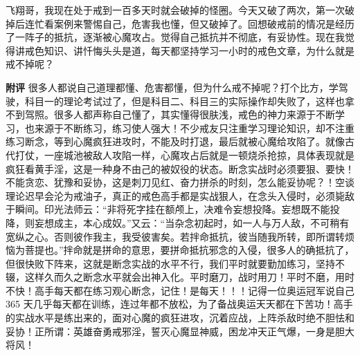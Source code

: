 \begin{case}
    飞翔哥，我现在处于戒到一百多天时就会破掉的怪圈。今天又破了两次，第一次破掉后连忙看案例来警惕自己，危害我也懂，但又破掉了。回想破戒前的情况是经历了一阵子的抵抗，逐渐被心魔攻占。觉得自己抵抗并不彻底，有妥协性。现在我觉得讲戒色知识、讲忏悔头头是道，每天都坚持学习一小时的戒色文章，为什么就是戒不掉呢？

    \textbf{附评} 很多人都说自己道理都懂、危害都懂，但为什么戒不掉呢？打个比方，学驾驶，科目一的理论考试过了，但是科目二、科目三的实际操作却失败了，这样也拿不到驾照。很多人都声称自己懂了，其实懂得很肤浅，戒色的神力来源于不断学习，也来源于不断练习，练习使人强大！不少戒友只注重学习理论知识，却不注重练习断念，等到心魔疯狂进攻时，不能及时打退，最后就被心魔给攻陷了。就像古代打仗，一座城池被敌人攻陷一样，心魔攻占后就是一顿烧杀抢掠，具体表现就是疯狂看黄手淫，这是一种身不由己的被奴役的状态。断念实战时必须要狠、要快！不能贪恋、犹豫和妥协，这是刺刀见红、奋力拼杀的时刻，怎么能妥协呢？！空谈理论迟早会沦为戒油子，真正的戒色高手都是实战狠人，在念头入侵时，必须毙敌于瞬间。印光法师云：“非将死字挂在额颅上，决难令妄想投降。妄想既不能投降，则妄想成主，本心成奴。”又云：“当杂念初起时，如一人与万人敌，不可稍有宽纵之心。否则彼作我主，我受彼害矣。若拌命抵抗，彼当随我所转，即所谓转烦恼为菩提也。”拌命就是拼命的意思，要拼命抵抗邪念的入侵，很多人的确抵抗了，但很快败下阵来，这就是断念实战的水平不行，我们平时就要勤加练习，坚持不辍，这样久而久之断念水平就会出神入化。平时磨刀，战时用刀！平时不磨，用时不快！高手每天都在练习观心断念，记住！是每天！！！记得一位奥运冠军说自己 365 天几乎每天都在训练，连过年都不放松，为了备战奥运天天都在下苦功！高手的实战水平是练出来的，面对心魔的疯狂进攻，沉着应战，上阵杀敌时绝不胆怯和妥协！正所谓：英雄奋勇戒邪淫，誓灭心魔显神威，困龙冲天正气爆，一身是胆大将风！
\end{case}

